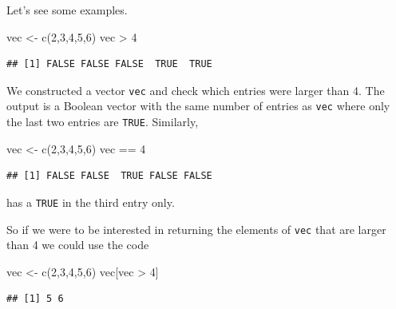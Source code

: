 \documentclass[
]{book}
\newenvironment{Shaded}{\begin{snugshade}}{\end{snugshade}}
\newcommand{\DecValTok}[1]{\textcolor[rgb]{0.00,0.00,0.81}{#1}}
\newcommand{\FunctionTok}[1]{\textcolor[rgb]{0.00,0.00,0.00}{#1}}
\newcommand{\NormalTok}[1]{#1}
\newcommand{\OtherTok}[1]{\textcolor[rgb]{0.56,0.35,0.01}{#1}}
\newcommand{\SpecialCharTok}[1]{\textcolor[rgb]{0.00,0.00,0.00}{#1}}
\begin{document}
Let's see some examples.

\begin{Shaded}
\begin{Highlighting}[]
\NormalTok{vec }\OtherTok{\textless{}{-}} \FunctionTok{c}\NormalTok{(}\DecValTok{2}\NormalTok{,}\DecValTok{3}\NormalTok{,}\DecValTok{4}\NormalTok{,}\DecValTok{5}\NormalTok{,}\DecValTok{6}\NormalTok{)}
\NormalTok{vec }\SpecialCharTok{\textgreater{}} \DecValTok{4}
\end{Highlighting}
\end{Shaded}

\begin{verbatim}
## [1] FALSE FALSE FALSE  TRUE  TRUE
\end{verbatim}

We constructed a vector \texttt{vec} and check which entries were larger than 4. The output is a Boolean vector with the same number of entries as \texttt{vec} where only the last two entries are \texttt{TRUE}. Similarly,

\begin{Shaded}
\begin{Highlighting}[]
\NormalTok{vec }\OtherTok{\textless{}{-}} \FunctionTok{c}\NormalTok{(}\DecValTok{2}\NormalTok{,}\DecValTok{3}\NormalTok{,}\DecValTok{4}\NormalTok{,}\DecValTok{5}\NormalTok{,}\DecValTok{6}\NormalTok{)}
\NormalTok{vec }\SpecialCharTok{==} \DecValTok{4}
\end{Highlighting}
\end{Shaded}

\begin{verbatim}
## [1] FALSE FALSE  TRUE FALSE FALSE
\end{verbatim}

has a \texttt{TRUE} in the third entry only.

So if we were to be interested in returning the elements of \texttt{vec} that are larger than 4 we could use the code

\begin{Shaded}
\begin{Highlighting}[]
\NormalTok{vec }\OtherTok{\textless{}{-}} \FunctionTok{c}\NormalTok{(}\DecValTok{2}\NormalTok{,}\DecValTok{3}\NormalTok{,}\DecValTok{4}\NormalTok{,}\DecValTok{5}\NormalTok{,}\DecValTok{6}\NormalTok{)}
\NormalTok{vec[vec }\SpecialCharTok{\textgreater{}} \DecValTok{4}\NormalTok{]}
\end{Highlighting}
\end{Shaded}

\begin{verbatim}
## [1] 5 6
\end{verbatim}
\end{document}

